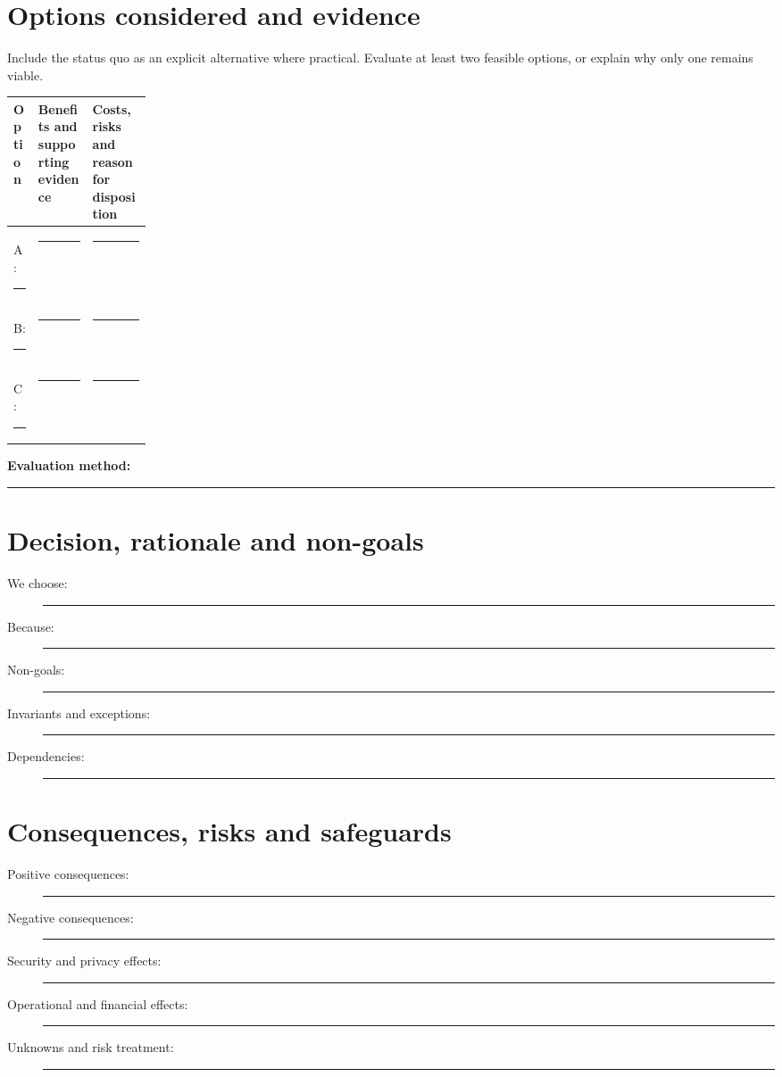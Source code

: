 \documentclass[11pt,letterpaper]{article}
\newcommand{\BlankResponse}{\rule[-0.4em]{0pt}{2em}\rule{0.65\linewidth}{0.4pt}}
\begin{document}
\section{Options considered and evidence}
Include the status quo as an explicit alternative where practical. Evaluate
at least two feasible options, or explain why only one remains viable.
\par\noindent\begin{tabularx}{\linewidth}{@{}>{\raggedright\arraybackslash}p{0.18\linewidth}>{\raggedright\arraybackslash}X >{\raggedright\arraybackslash}X@{}}
\toprule
\textbf{Option} & \textbf{Benefits and supporting evidence} & \textbf{Costs, risks and reason for disposition}\\
\midrule
A: \BlankResponse & \BlankResponse & \BlankResponse\\
B: \BlankResponse & \BlankResponse & \BlankResponse\\
C: \BlankResponse & \BlankResponse & \BlankResponse\\
\bottomrule
\end{tabularx}\par

\noindent\textbf{Evaluation method:} \BlankResponse

\section{Decision, rationale and non-goals}
\begin{description}
\item[We choose:] \BlankResponse
\item[Because:] \BlankResponse
\item[Non-goals:] \BlankResponse
\item[Invariants and exceptions:] \BlankResponse
\item[Dependencies:] \BlankResponse
\end{description}


\section{Consequences, risks and safeguards}
\begin{description}
\item[Positive consequences:] \BlankResponse
\item[Negative consequences:] \BlankResponse
\item[Security and privacy effects:] \BlankResponse
\item[Operational and financial effects:] \BlankResponse
\item[Unknowns and risk treatment:] \BlankResponse
\end{description}
\end{document}
